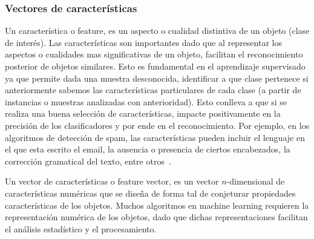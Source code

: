\subsubsection{Vectores de características} \label{subsec:feature}

	Un característica o feature, es un aspecto o cualidad distintiva de un objeto (clase de interés). Las características son importantes dado que al representar los aspectos o cualidades mas significativas de un objeto, facilitan el reconocimiento posterior de objetos similares. Esto es fundamental en el aprendizaje supervisado ya que permite dada una muestra desconocida, identificar a que clase pertenece si anteriormente sabemos las características particulares de cada clase (a partir de instancias o muestras analizadas con anterioridad). Esto conlleva a que si se realiza una buena selección de características, impacte positivamente en la precisión de los clasificadores y por ende en el reconocimiento. Por ejemplo, en los algoritmos de detección de spam, las características pueden incluir el lenguaje en el que esta escrito el email, la ausencia o presencia de ciertos encabezados, la corrección gramatical del texto, entre otros~\cite{SpamPaper}.

	Un vector de características o feature vector, es un  vector $n$-dimensional de características numéricas que se diseña de forma tal de conjeturar propiedades características de los objetos. Muchos algoritmos en machine learning requieren la representación numérica de los objetos, dado que dichas representaciones facilitan el análisis estadístico y el procesamiento.
		
	
		
	
